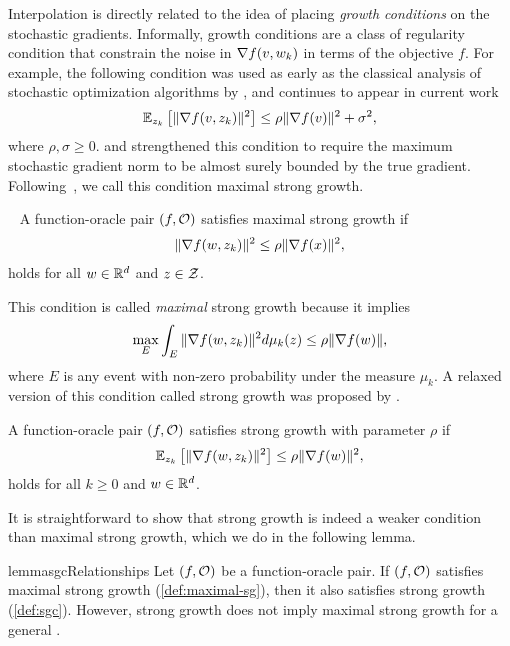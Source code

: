 Interpolation is directly related to the idea of placing \emph{growth conditions} on the stochastic gradients.
Informally, growth conditions are a class of regularity condition that constrain the noise in \( \grad(v, \wk) \) in terms of the objective \( f \).
For example, the following condition was used as early as the classical analysis of stochastic optimization algorithms by \citet{poljak1973pseudogradient}, and continues to appear in current work~\citep{bertsekas2000gradient, khaled2020better}  
\[ \Ek \sbr{\norm{\grad(v, \zk)}^2} \leq \rho \norm{\grad(v)}^2 + \sigma^2,  \]
where \( \rho, \sigma \geq 0 \).
\citet{tseng1998incremental} and \citet{solodov1998incremental} strengthened this condition to require the maximum stochastic gradient norm to be almost surely bounded by the true gradient.
Following~\citet{khaled2020better}, we call this condition maximal strong growth.
\begin{definition}~\label{def:maximal-sg}
    A function-oracle pair \( \rbr{f, \oracle{}} \) satisfies maximal strong growth if  
    \begin{align*}
        \norm{\grad(\w, \zk)}^2 \leq \rho \norm{\grad(x)}^2, 
    \end{align*}
    holds for all \( \w \in \R^d \) and \( \z \in \calZ \).
\end{definition}
This condition is called \emph{maximal} strong growth because it implies 
    \[ \max_{E} \int_{E} \norm{\grad(\w, \zk)}^2 d\mu_k(\z) \leq \rho \norm{\grad(\w)}, \]
    where \( E \) is any event with non-zero probability under the measure \( \mu_k \). 
A relaxed version of this condition called strong growth was proposed by \citet{vaswani2019fast}.
\begin{definition}\label{def:sgc}
    A function-oracle pair \( \rbr{f, \oracle{}} \) satisfies strong growth with parameter \(\rho \) if
    \[ \Ek \sbr{\norm{\grad(\w, \zk)}^2} \leq \rho \norm{\grad(\w)}^2, \]
    holds for all \( k \geq 0 \) and \( \w \in \R^d \).
\end{definition}
It is straightforward to show that strong growth is indeed a weaker condition than maximal strong growth, which we do in the following lemma.
\begin{restatable}{lemma}{sgcRelationships}\label{thm:sgc-relationships}
    Let \( \rbr{f, \oracle{}} \) be a function-oracle pair. 
    If \( \rbr{f, \oracle{}} \) satisfies maximal strong growth (\autoref{def:maximal-sg}), then it also satisfies strong growth (\autoref{def:sgc}).
    However, strong growth does not imply maximal strong growth for a general \oracle{}.  
\end{restatable} 
